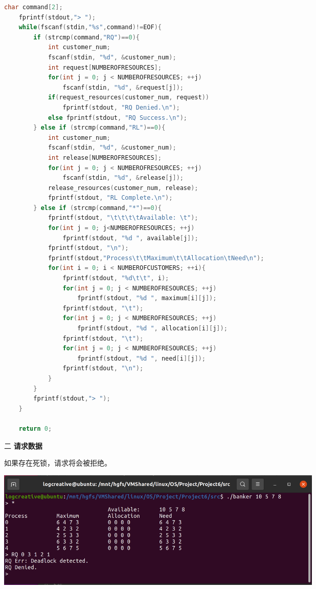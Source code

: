 \documentclass[12pt,a4paper]{article}
\newenvironment{problems}{\begin{list}{}{\renewcommand{\makelabel}[1]{\textbf{##1}\hfil}}}{\end{list}}
\begin{document}
\begin{problems}
    \begin{lstlisting}[language=c]
    char command[2];
    fprintf(stdout,"> ");
    while(fscanf(stdin,"%s",command)!=EOF){
        if (strcmp(command,"RQ")==0){
            int customer_num;
            fscanf(stdin, "%d", &customer_num);
            int request[NUMBEROFRESOURCES];
            for(int j = 0; j < NUMBEROFRESOURCES; ++j)
                fscanf(stdin, "%d", &request[j]);
            if(request_resources(customer_num, request))
                fprintf(stdout, "RQ Denied.\n");
            else fprintf(stdout, "RQ Success.\n");
        } else if (strcmp(command,"RL")==0){
            int customer_num;
            fscanf(stdin, "%d", &customer_num);
            int release[NUMBEROFRESOURCES];
            for(int j = 0; j < NUMBEROFRESOURCES; ++j)
                fscanf(stdin, "%d", &release[j]);
            release_resources(customer_num, release);
            fprintf(stdout, "RL Complete.\n");
        } else if (strcmp(command,"*")==0){
            fprintf(stdout, "\t\t\t\tAvailable: \t");
            for(int j = 0; j<NUMBEROFRESOURCES; ++j)
                fprintf(stdout, "%d ", available[j]);
            fprintf(stdout, "\n");
            fprintf(stdout,"Process\t\tMaximum\t\tAllocation\tNeed\n");
            for(int i = 0; i < NUMBEROFCUSTOMERS; ++i){
                fprintf(stdout, "%d\t\t", i); 
                for(int j = 0; j < NUMBEROFRESOURCES; ++j)
                    fprintf(stdout, "%d ", maximum[i][j]);
                fprintf(stdout, "\t");
                for(int j = 0; j < NUMBEROFRESOURCES; ++j)
                    fprintf(stdout, "%d ", allocation[i][j]);
                fprintf(stdout, "\t");
                for(int j = 0; j < NUMBEROFRESOURCES; ++j)
                    fprintf(stdout, "%d ", need[i][j]);
                fprintf(stdout, "\n");
            }
        }
        fprintf(stdout,"> ");
    }

    return 0;
    \end{lstlisting}
    \item[二] \textbf{请求数据}
    
    如果存在死锁，请求将会被拒绝。

    \includegraphics[width=0.7\textwidth]{RQd.png}


\end{problems}
\end{document}
